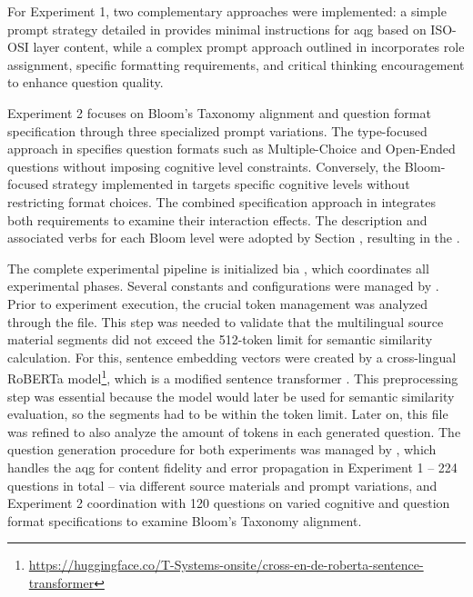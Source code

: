 For Experiment 1, two complementary approaches were implemented: a simple prompt strategy detailed in  provides minimal instructions for \ac{aqg} based on ISO-OSI layer content, while a complex prompt approach outlined in  incorporates role assignment, specific formatting requirements, and critical thinking encouragement to enhance question quality.

\pagebreak

Experiment 2 focuses on Bloom's Taxonomy alignment and question format specification through three specialized prompt variations. The type-focused approach in  specifies question formats such as Multiple-Choice and Open-Ended questions without imposing cognitive level constraints. Conversely, the Bloom-focused strategy implemented in  targets specific cognitive levels without restricting format choices. The combined specification approach in  integrates both requirements to examine their interaction effects. The description and associated verbs for each Bloom level were adopted by Section , resulting in the .

The complete experimental pipeline is initialized bia , which coordinates all experimental phases. Several constants and configurations were managed by . Prior to experiment execution, the crucial token management was analyzed through the  file. This step was needed to validate that the multilingual source material segments did not exceed the 512-token limit for semantic similarity calculation. For this, sentence embedding vectors were created by a cross-lingual RoBERTa model\footnote{\url{https://huggingface.co/T-Systems-onsite/cross-en-de-roberta-sentence-transformer}}, which is a modified sentence transformer \cite{reimers_sentence-bert_2019}. This preprocessing step was essential because the model would later be used for semantic similarity evaluation, so the segments had to be within the token limit. Later on, this file was refined to also analyze the amount of tokens in each generated question.
The question generation procedure for both experiments was managed by , which handles the \ac{aqg} for content fidelity and error propagation in Experiment 1 -- 224 questions in total -- via different source materials and prompt variations, and Experiment 2 coordination with 120 questions on varied cognitive and question format specifications to examine Bloom's Taxonomy alignment.

